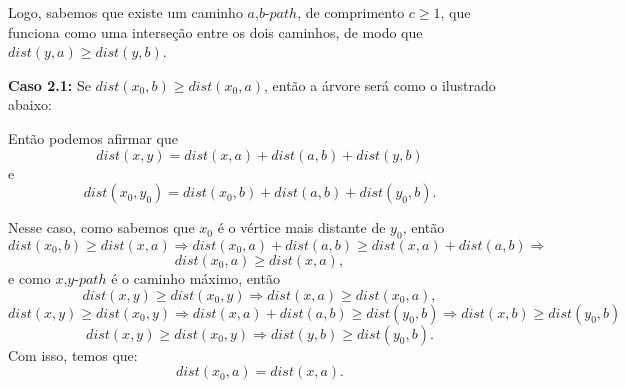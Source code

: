\documentclass[a4paper,12pt]{article}
\begin{document}
\begin{itemize}
         	Logo, sabemos que existe um caminho $a$,$b$-$path$, 
            de comprimento $c \ge 1$,
            que funciona como uma interseção entre os dois 
            caminhos, de modo que $dist(y,a)\ge dist(y,b)$.
            
            
            \bigskip

            \textbf{Caso 2.1:} Se 
            $dist(x_0,b)\ge dist(x_0,a)$, então a árvore será
            como o ilustrado abaixo:

			
			Então podemos afirmar que 
			$$ dist(x,y) = dist(x,a) + dist(a,b) + dist(y,b) $$ e
            $$ dist(x_0,y_0) = dist(x_0,b) + dist(a,b) + 
            dist(y_0,b).$$

			Nesse caso, como sabemos que $x_0$ é o vértice mais
			distante de $y_0$, então
			$$  dist(x_0,b)\ge dist(x,a) \Rightarrow 
			dist(x_0,a) + dist(a,b)\ge dist(x,a) + dist(a,b)
			\Rightarrow$$ 
			$$ dist(x_0,a)\ge dist(x,a), $$
			e como $x$,$y$-$path$ é o caminho máximo, então
			$$  dist(x,y)\ge dist(x_0,y) \Rightarrow 
			dist(x,a)\ge dist(x_0,a), $$ 
			$$  dist(x,y)\ge dist(x_0,y) \Rightarrow 
			dist(x,a) + dist(a,b)\ge dist(y_0,b)\Rightarrow
			dist(x,b)\ge dist(y_0,b) $$
			$$  dist(x,y)\ge dist(x_0,y) \Rightarrow 
			dist(y,b)\ge dist(y_0,b). $$
			Com isso, temos que: $$dist(x_0,a)=dist(x,a).$$


\end{itemize}
\end{document}
